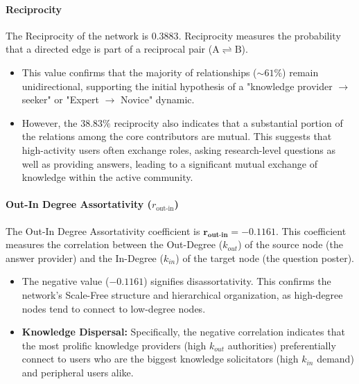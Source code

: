 \documentclass[sigplan]{acmart}
\begin{document}
\paragraph{Reciprocity}
The Reciprocity of the network is $\mathbf{0.3883}$. Reciprocity measures the probability that a directed edge is part of a reciprocal pair ($\mathrm{A} \rightleftharpoons \mathrm{B}$).
\begin{itemize}
    \item This value confirms that the majority of relationships ($\sim 61\%$) remain unidirectional, supporting the initial hypothesis of a "knowledge provider $\to$ seeker" or "Expert $\to$ Novice" dynamic.
    \item However, the $\mathbf{38.83\%}$ reciprocity also indicates that a substantial portion of the relations among the core contributors are mutual. This suggests that high-activity users often exchange roles, asking research-level questions as well as providing answers, leading to a significant mutual exchange of knowledge within the active community.
\end{itemize}

\paragraph{Out-In Degree Assortativity ($r_{\text{out-in}}$)}
The Out-In Degree Assortativity coefficient is $\mathbf{r_{\text{out-in}} = -0.1161}$. This coefficient measures the correlation between the Out-Degree ($k_{out}$) of the source node (the answer provider) and the In-Degree ($k_{in}$) of the target node (the question poster).
\begin{itemize}
    \item The negative value ($\mathbf{-0.1161}$) signifies disassortativity. This confirms the network's Scale-Free structure and hierarchical organization, as high-degree nodes tend to connect to low-degree nodes.
    \item \textbf{Knowledge Dispersal:} Specifically, the negative correlation indicates that the most prolific knowledge providers (high $k_{out}$ authorities) preferentially connect to users who are the biggest knowledge solicitators (high $k_{in}$ demand) and peripheral users alike.
\end{itemize}
\end{document}
